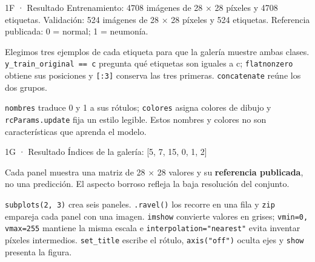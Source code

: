 \begin{Salida}{1F · Resultado}
Entrenamiento: 4708 imágenes de 28 × 28 píxeles y 4708 etiquetas.
Validación: 524 imágenes de 28 × 28 píxeles y 524 etiquetas.
Referencia publicada: 0 = normal; 1 = neumonía.
\end{Salida}

\label{paso-1g}

Elegimos tres ejemplos de cada etiqueta para que la galería muestre ambas clases. \texttt{\small y\_\allowbreak{}train\_\allowbreak{}original =\allowbreak{}=\allowbreak{} c} pregunta qué etiquetas son iguales a c; \texttt{\small flatnonzero} obtiene sus posiciones y \texttt{\small [\allowbreak{}:\allowbreak{}3]\allowbreak{}} conserva las tres primeras. \texttt{\small concatenate} reúne los dos grupos.

\texttt{\small nombres} traduce 0 y 1 a sus rótulos; \texttt{\small colores} asigna colores de dibujo y \texttt{\small rcParams.\allowbreak{}update} fija un estilo legible. Estos nombres y colores no son características que aprenda el modelo.



\begin{Salida}{1G · Resultado}
Índices de la galería: [5, 7, 15, 0, 1, 2]
\end{Salida}

\label{paso-1h}

Cada panel muestra una matriz de 28 $\times$ 28 valores y su \textbf{referencia publicada}, no una predicción. El aspecto borroso refleja la baja resolución del conjunto.

\texttt{\small subplots(\allowbreak{}2,\allowbreak{} 3)\allowbreak{}} crea seis paneles. \texttt{\small .\allowbreak{}ravel(\allowbreak{})\allowbreak{}} los recorre en una fila y \texttt{\small zip} empareja cada panel con una imagen. \texttt{\small imshow} convierte valores en grises; \texttt{\small vmin=\allowbreak{}0,\allowbreak{} vmax=\allowbreak{}255} mantiene la misma escala e \texttt{\small interpolation=\allowbreak{}"nearest"} evita inventar píxeles intermedios. \texttt{\small set\_\allowbreak{}title} escribe el rótulo, \texttt{\small axis(\allowbreak{}"off")\allowbreak{}} oculta ejes y \texttt{\small show} presenta la figura.


